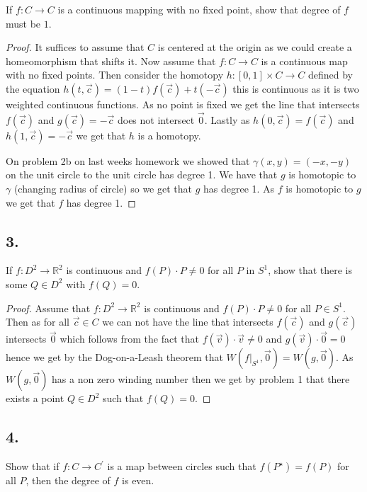 \documentclass{amsart}
\theoremstyle{plain}
\theoremstyle{definition}
\theoremstyle{remark}
\begin{document}
If $f:C\to C$  is a continuous mapping with no fixed point, show that degree of $f$ must be $1$. 
\begin{proof}
    It suffices to assume that $C$ is centered at the origin as we could create a homeomorphism that shifts it. Now assume that $f:C\to C$ is a continuous map with no fixed points. Then consider the homotopy $h:[0,1]\times C\to C$ defined by the equation $h(t,\vec c)=(1-t)f(\vec c)+t(-\vec c)$ this is continuous as it is two weighted continuous functions. As no point is fixed we get the line that intersects $f(\vec c)$ and $g(\vec c)=-\vec c$ does not intersect $\vec 0$. Lastly as $h(0,\vec c)=f(\vec c)$ and $h(1,\vec c)=-\vec c$ we get that $h$ is a homotopy. 
    
    On problem 2b on last weeks homework we showed that $\gamma(x,y)=(-x,-y)$ on the unit circle to the unit circle has degree 1. We have that $g$ is homotopic to $\gamma$ (changing radius of circle) so we get that $g$ has degree 1. As $f$ is homotopic to $g$ we get that $f$ has degree 1.

\end{proof}


\vspace{.15in}
\noindent
\subsection*{3.}
If $f:D^2\to \mathbb{R}^2$ is continuous and $f(P)\cdot P\not = 0$ for all $P$ in $S^1$, show that there is some $Q\in D^2$ with $f(Q)=0$.

\begin{proof}
    Assume that $f:D^2\to \mathbb{R}^2$ is continuous and $f(P)\cdot P\not =0$ for all $P\in S^1$. Then as for all $\vec c\in C$ we can not have the line that intersects $f(\vec c)$ and $g(\vec c)$ intersects $\vec 0$ which follows from the fact that $f(\vec v)\cdot \vec v\not =0 $ and $g(\vec v)\cdot \vec 0=0$ hence we get by the Dog-on-a-Leash theorem that $W(f|_{S^1},\vec 0)=W(g,\vec 0)$. As $W(g,\vec 0)$ has a non zero winding number then we get by problem 1 that there exists a point $Q\in D^2$ such that $f(Q)=0$.

\end{proof}


\vspace{.15in}
\noindent
\subsection*{4.} Show that if $f:C\to C^\prime$ is a map between circles such that $f(P^\star)=f(P)$ for all $P$, then the degree of $f$ is even.
\end{document}
